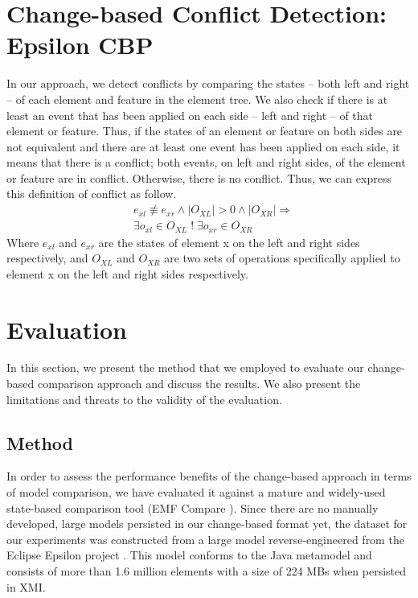 \section{Change-based Conflict Detection: Epsilon CBP}
\label{change_based_conflict_detection_epsilon_cbp}
In our approach, we detect conflicts by comparing the states -- both left and right -- of each element and feature in the element tree. We also check if there is at least an event that has been applied on each side -- left and right -- of that element or feature. Thus, if the states of an element or feature on both sides are not equivalent and there are at least one event has been applied on each side, it means that there is a conflict; both events, on left and right sides, of the element or feature are in conflict. Otherwise, there is no conflict. Thus, we can express this definition of conflict as follow.
\begin{equation} \label{eq:conflict_3.1}
\begin{split}
& e_{xl} \not\equiv e_{xr} \wedge |O_{XL}| > 0 \wedge |O_{XR}| \Rightarrow\\
& \exists o_{xl} \in O_{XL} \;!\; \exists o_{xr} \in O_{XR}
\end{split}
\end{equation} 
Where $e_{xl}$ and $e_{xr}$ are the states of element \textsf{x} on the left and right sides respectively, and $O_{XL}$ and $O_{XR}$ are two sets of operations specifically applied to element \textsf{x} on the left and right sides respectively.
 



\section{Evaluation}
\label{sec:evaluation}
In this section, we present the method that we employed to evaluate our change-based comparison approach and discuss the results. We also present the limitations and threats to the validity of the evaluation.
\subsection{Method}
\label{sec:method}
In order to assess the performance benefits of the change-based approach in terms of model comparison, we have evaluated it against a mature and widely-used state-based comparison tool (EMF Compare \cite{emfcompare2018developer,eclipse2017compare}). Since there are no manually developed, large models persisted in our change-based format yet, the dataset for our experiments was constructed from a large model reverse-engineered from the Eclipse Epsilon project \cite{eclipse2018epsilongit,eclipse2017epsilon}. This model conforms to the Java metamodel \cite{eclipse2018modiscojava} and consists of more than 1.6 million elements with a size of 224 MBs when persisted in XMI. 

